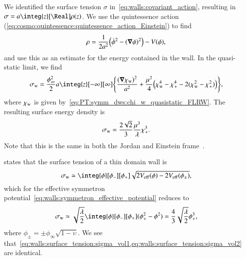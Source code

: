 





We identified the surface tension $\sigma$ in~\cref{eq:walls:covariant_action}, resulting in $\sigma = a \integ{z}[\Real] \rho(z) $. We use the quintessence action (\cref{eq:cosmo:quintessence:quintessence_action_Einstein}) to find~\citep{llinaresDomainWallsCoupled2014}
\begin{align}
    \rho = \frac{1}{2a^2} {\left( \dot{\phi}^2 - {(\boldsymbol{\nabla}\phi)}^2 \right)} - V(\phi),
\end{align}
and use this as an estimate for the energy contained in the wall. %
In the quasi-static limit, we find
\begin{equation}
    \sigma\ped{w} = \frac{\phi_\infty^2 }{2}a \integ{z}[-\infty][\infty] \cclosed{
        \frac{{(\vec{\nabla}\chi\ped{w})}^2}{a^2} + \frac{\mu^2}{4} \pclosed{\chi\ped{w}^4 - \chi_+^4 - 2 (\chi\ped{w}^2-\chi_+^2)}
    },
\end{equation}
where $\chi_\mathrm{w}$ is given by~\cref{eq:PT:symm_dws:chi_w_quasistatic_FLRW}. The resulting surface energy density is 
\begin{equation}\label{eq:walls:surface_tension:sigma_vol1}
    \sigma_\mathrm{w} = \frac{2\sqrt{2}}{3} \frac{\mu^3}{\lambda} \chi_+^3.
\end{equation}
Note that this is the same in both the Jordan and Einstein frame~\citep{llinaresDomainWallsCoupled2014}.

\citet{christiansenGravitationalWavesDark2024} states that the surface tension of a thin domain wall is
\begin{equation}\label{eq:walls:surface_tension:sigma_V_eff}
    \sigma\ped{w} \simeq \integ{\phi}[\phi_-][\phi_+] \sqrt{ 2V\ped{eff}(\phi)-2V\ped{eff}(\phi_\pm) },
\end{equation}
which for the effective symmetron potential~\cref{eq:walls:symmetron_effective_potential}
reduces to 
\begin{equation}\label{eq:walls:surface_tension:sigma_vol2}
    \sigma\ped{w} \simeq  \sqrt{\frac{\lambda}{2}}\integ{\phi}[\phi_-][\phi_+]  (\phi_+^2 - \phi^2) = \frac{4}{3}\sqrt{\frac{\lambda}{2}} \phi_+^3,
\end{equation}
where $\phi_\pm = \pm \phi_\infty \sqrt{1-\upsilon}$. We see that~\cref{eq:walls:surface_tension:sigma_vol1,eq:walls:surface_tension:sigma_vol2} are identical.



